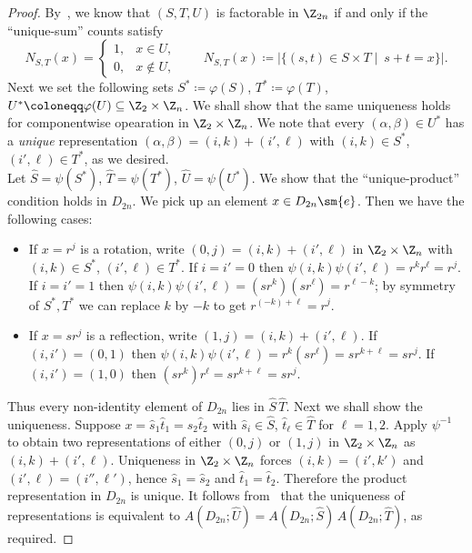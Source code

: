 \documentclass{file}
\begin{document}
\begin{proof}
By~, we know that $(S,T,U)$ is factorable in $\Z_{2n}$ if and only if 
the “unique-sum” counts satisfy
\[
N_{S,T}(x)=
\begin{cases}
1,&x\in U,\\
0,&x\notin U,
\end{cases}
\qquad
N_{S,T}(x)\coloneqq |\{(s,t)\in S\times T\mid \ s+t=x\}|.
\]
Next we set the following sets
$S^*\coloneqq \varphi(S)$, $T^*\coloneqq \varphi(T)$, $U^*\coloneqq \varphi(U)\subseteq\Z_2\times\Z_n$.
We shall show that the same uniqueness holds for componentwise opearation in $\Z_2\times\Z_n$.
We note that every $(\alpha,\beta)\in U^*$ has a \emph{unique} representation
$(\alpha,\beta)=(i,k)+(i',\ell)$ with $(i,k)\in S^*$, $(i',\ell)\in T^*$, as we desired.\\
Let $\widehat S=\psi(S^*)$, $\widehat T=\psi(T^*)$, $\widehat U=\psi(U^*)$.
We show that the “unique-product” condition holds in $D_{2n}$.
We pick up an element $x\in D_{2n}\sm \{e\}$.
Then we have the following cases:
\begin{itemize}
\item If $x=r^j$ is a rotation, write $(0,j)=(i,k)+(i',\ell)$ in $\Z_2\times\Z_n$ with
$(i,k)\in S^*$, $(i',\ell)\in T^*$. If $i=i'=0$ then
$\psi(i,k)\psi(i',\ell)=r^{k}r^{\ell}=r^j$. If $i=i'=1$ then
$\psi(i,k)\psi(i',\ell)=(sr^{k})(sr^{\ell})=r^{\ell-k}$; by symmetry of $S^*,T^*$
we can replace $k$ by $-k$ to get $r^{(-k)+\ell}=r^j$. 
\item If $x=sr^j$ is a reflection, write $(1,j)=(i,k)+(i',\ell)$. If $(i,i')=(0,1)$ then
$\psi(i,k)\psi(i',\ell)=r^{k}(sr^{\ell})=sr^{k+\ell}=sr^j$. 
If $(i,i')=(1,0)$ then
$(sr^{k})r^{\ell}=sr^{k+\ell}=sr^j$.
\end{itemize}

Thus every non-identity element of $D_{2n}$ lies in $\widehat S\,\widehat T$.
Next we shall show the uniqueness.
Suppose $x=\widehat s_1\widehat t_1=\widehat s_2\widehat t_2$ with
$\widehat s_i\in\widehat S$, $\widehat t_{\ell}\in\widehat T$ for $\ell=1,2$.
Apply $\psi^{-1}$ to obtain two representations of either $(0,j)$ or $(1,j)$ in
$\Z_2\times\Z_n$ as $(i,k)+(i',\ell)$. Uniqueness in $\Z_2\times\Z_n$ forces
$(i,k)=(i',k')$ and $(i',\ell)=(i'',\ell')$, hence $\widehat s_1=\widehat s_2$ and
$\widehat t_1=\widehat t_2$. Therefore the product representation in $D_{2n}$ is unique.
It follows from~ that the uniqueness of representations is equivalent to
$A(D_{2n};\widehat U)=A(D_{2n};\widehat S)\,A(D_{2n};\widehat T)$, as required.


\end{proof}
\end{document}
